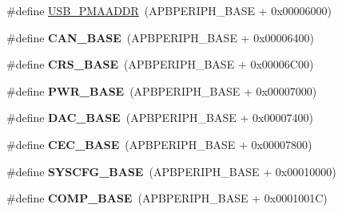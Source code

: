 \begin{DoxyCompactItemize}
\item 
\#define \hyperlink{group___peripheral__memory__map_gaf992dfdd5707568c5cb5506e2347e808}{U\+S\+B\+\_\+\+P\+M\+A\+A\+D\+DR}~(A\+P\+B\+P\+E\+R\+I\+P\+H\+\_\+\+B\+A\+SE + 0x00006000)
\item 
\mbox{\label{group___peripheral__memory__map_gacbe030cda8eb3031d55a759612a9042d}} 
\#define {\bfseries C\+A\+N\+\_\+\+B\+A\+SE}~(A\+P\+B\+P\+E\+R\+I\+P\+H\+\_\+\+B\+A\+SE + 0x00006400)
\item 
\mbox{\label{group___peripheral__memory__map_ga53cd25310ec0663a7395042bd860fedc}} 
\#define {\bfseries C\+R\+S\+\_\+\+B\+A\+SE}~(A\+P\+B\+P\+E\+R\+I\+P\+H\+\_\+\+B\+A\+SE + 0x00006\+C00)
\item 
\mbox{\label{group___peripheral__memory__map_gac691ec23dace8b7a649a25acb110217a}} 
\#define {\bfseries P\+W\+R\+\_\+\+B\+A\+SE}~(A\+P\+B\+P\+E\+R\+I\+P\+H\+\_\+\+B\+A\+SE + 0x00007000)
\item 
\mbox{\label{group___peripheral__memory__map_gad18d0b914c7f68cecbee1a2d23a67d38}} 
\#define {\bfseries D\+A\+C\+\_\+\+B\+A\+SE}~(A\+P\+B\+P\+E\+R\+I\+P\+H\+\_\+\+B\+A\+SE + 0x00007400)
\item 
\mbox{\label{group___peripheral__memory__map_gaacb77bc44b3f8c87ab98f241e760e440}} 
\#define {\bfseries C\+E\+C\+\_\+\+B\+A\+SE}~(A\+P\+B\+P\+E\+R\+I\+P\+H\+\_\+\+B\+A\+SE + 0x00007800)
\item 
\mbox{\label{group___peripheral__memory__map_ga62246020bf3b34b6a4d8d0e84ec79d3d}} 
\#define {\bfseries S\+Y\+S\+C\+F\+G\+\_\+\+B\+A\+SE}~(A\+P\+B\+P\+E\+R\+I\+P\+H\+\_\+\+B\+A\+SE + 0x00010000)
\item 
\mbox{\label{group___peripheral__memory__map_gaa9f5d2999c6918e385d7a526c4f6b1d3}} 
\#define {\bfseries C\+O\+M\+P\+\_\+\+B\+A\+SE}~(A\+P\+B\+P\+E\+R\+I\+P\+H\+\_\+\+B\+A\+SE + 0x0001001\+C)
\item 
\mbox{\label{group___peripheral__memory__map_ga87371508b3bcdcd98cd1ec629be29061}} 

\end{DoxyCompactItemize}

